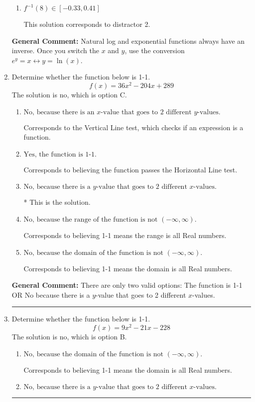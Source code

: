 \documentclass{extbook}[14pt]
\newcommand{\litem}[1]{\item #1

\rule{\textwidth}{0.4pt}}
\begin{document}
\begin{enumerate}
{\begin{enumerate}[label=\Alph*.]
 This is the solution.
\item \( f^{-1}(8) \in [-0.33, 0.41] \)

 This solution corresponds to distractor 2.
\end{enumerate}

\textbf{General Comment:} Natural log and exponential functions always have an inverse. Once you switch the $x$ and $y$, use the conversion $ e^y = x \leftrightarrow y=\ln(x)$.
}
\litem{
Determine whether the function below is 1-1.
\[ f(x) = 36 x^2 - 204 x + 289 \]The solution is \( \text{no} \), which is option C.\begin{enumerate}[label=\Alph*.]
\item \( \text{No, because there is an $x$-value that goes to 2 different $y$-values.} \)

Corresponds to the Vertical Line test, which checks if an expression is a function.
\item \( \text{Yes, the function is 1-1.} \)

Corresponds to believing the function passes the Horizontal Line test.
\item \( \text{No, because there is a $y$-value that goes to 2 different $x$-values.} \)

* This is the solution.
\item \( \text{No, because the range of the function is not $(-\infty, \infty)$.} \)

Corresponds to believing 1-1 means the range is all Real numbers.
\item \( \text{No, because the domain of the function is not $(-\infty, \infty)$.} \)

Corresponds to believing 1-1 means the domain is all Real numbers.
\end{enumerate}

\textbf{General Comment:} There are only two valid options: The function is 1-1 OR No because there is a $y$-value that goes to 2 different $x$-values.
}
\litem{
Determine whether the function below is 1-1.
\[ f(x) = 9 x^2 - 21 x - 228 \]The solution is \( \text{no} \), which is option B.\begin{enumerate}[label=\Alph*.]
\item \( \text{No, because the domain of the function is not $(-\infty, \infty)$.} \)

Corresponds to believing 1-1 means the domain is all Real numbers.
\item \( \text{No, because there is a $y$-value that goes to 2 different $x$-values.} \)


\end{enumerate}}
\end{enumerate}
\end{document}
